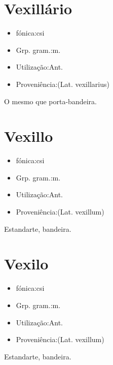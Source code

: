 \documentclass{article}
\begin{document}
\section{Vexillário}
\begin{itemize}
\item {fónica:csi}
\end{itemize}
\begin{itemize}
\item {Grp. gram.:m.}
\end{itemize}
\begin{itemize}
\item {Utilização:Ant.}
\end{itemize}
\begin{itemize}
\item {Proveniência:(Lat. \textunderscore vexillarius\textunderscore )}
\end{itemize}
O mesmo que \textunderscore porta-bandeira\textunderscore .
\section{Vexillo}
\begin{itemize}
\item {fónica:csi}
\end{itemize}
\begin{itemize}
\item {Grp. gram.:m.}
\end{itemize}
\begin{itemize}
\item {Utilização:Ant.}
\end{itemize}
\begin{itemize}
\item {Proveniência:(Lat. \textunderscore vexillum\textunderscore )}
\end{itemize}
Estandarte, bandeira.
\section{Vexilo}
\begin{itemize}
\item {fónica:csi}
\end{itemize}
\begin{itemize}
\item {Grp. gram.:m.}
\end{itemize}
\begin{itemize}
\item {Utilização:Ant.}
\end{itemize}
\begin{itemize}
\item {Proveniência:(Lat. \textunderscore vexillum\textunderscore )}
\end{itemize}
Estandarte, bandeira.
\end{document}

